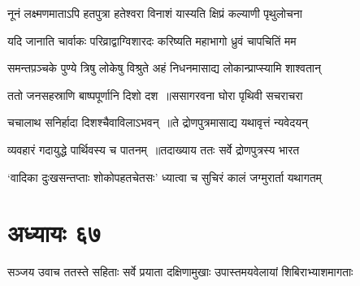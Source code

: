 \twolineshloka
{नूनं लक्ष्मणमाताऽपि हतपुत्रा हतेश्वरा}
{विनाशं यास्यति क्षिप्रं कल्याणी पृथुलोचना}


\twolineshloka
{यदि जानाति चार्वाकः परिव्राद्वाग्विशारदः}
{करिष्यति महाभागो ध्रुवं चापचितिं मम}


\twolineshloka
{समन्तप़ञ्चके पुण्ये त्रिषु लोकेषु विश्रुते}
{अहं निधनमासाद्य लोकान्प्राप्स्यामि शाश्वतान्}


\twolineshloka
{ततो जनसहस्राणि बाष्पपूर्णानि दिशो दश ॥ससागरवना घोरा पृथिवी सचराचरा}
{}


\twolineshloka
{चचालाथ सनिर्हादा दिशश्चैवाविलाऽभवन् ॥ते द्रोणपुत्रमासाद्य यथावृत्तं न्यवेदयन्}
{}


\twolineshloka
{व्यवहारं गदायुद्धे पार्थिवस्य च पातनम् ॥तदाख्याय ततः सर्वे द्रोणपुत्रस्य भारत}
{}


\twolineshloka
{`वादिका दुःखसन्तप्ताः शोकोपहतचेतसः'}
{ध्यात्वा च सुचिरं कालं जग्मुरार्ता यथागतम्}


\chapter{अध्यायः ६७}
\threelineshloka
{सञ्जय उवाच}
{ततस्ते सहिताः सर्वे प्रयाता दक्षिणामुखाः}
{उपास्तमयवेलायां शिबिराभ्याशमागताः}


